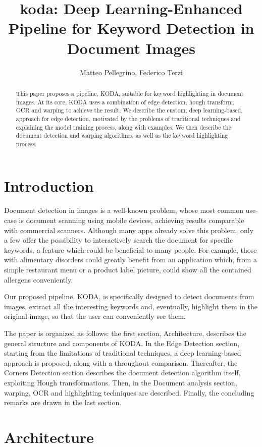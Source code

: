 \documentclass[a4paper]{article}
\title{koda: Deep Learning-Enhanced Pipeline for Keyword Detection in Document Images}
\author{Matteo Pellegrino, Federico Terzi}
\begin{document}
\maketitle

\begin{abstract}
This paper proposes a pipeline, KODA, suitable for keyword highlighting in document images. At its core, KODA uses a combination of edge detection, hough transform, OCR and warping to achieve the result. 
We describe the custom, deep learning-based, approach for edge detection, motivated by the problems of traditional techniques and explaining the model training process, along with examples.
We then describe the document detection and warping algorithms, as well as the keyword highlighting process.
\end{abstract}

\section{Introduction}
Document detection in images is a well-known problem, whose most common use-case is document scanning using mobile devices, achieving results comparable with commercial scanners. Although many apps already solve this problem, only a few offer the possibility to interactively search the document for specific keywords, a feature which could be beneficial to many people. For example, those with alimentary disorders could greatly benefit from an application which, from a simple restaurant menu or a product label picture, could show all the contained allergens conveniently.

Our proposed pipeline, KODA, is specifically designed to detect documents from images, extract all the interesting keywords and, eventually, highlight them in the original image, so that the user can conveniently see them.

The paper is organized as follows: the first section, Architecture, describes the general structure and components of KODA. In the Edge Detection section, starting from the limitations of traditional techniques, a deep learning-based approach is proposed, along with a throughout comparison. Thereafter, the Corners Detection section describes the document detection algorithm itself, exploiting Hough transformations. Then, in the Document analysis section, warping, OCR and highlighting techniques are described. Finally, the concluding remarks are drawn in the last section.

\section{Architecture}
\end{document}
